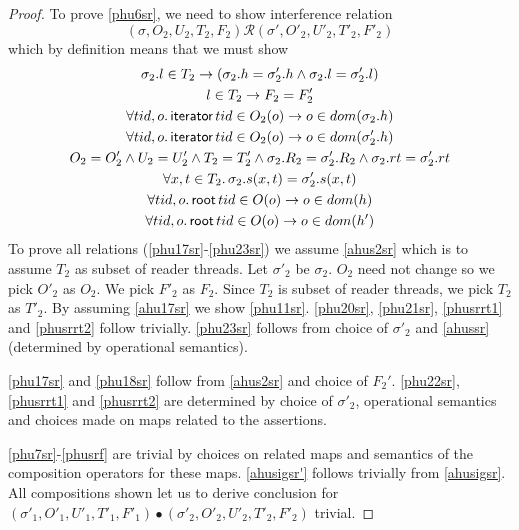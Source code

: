\begin{proof}
To prove \ref{phu6sr}, we need to show interference relation
\[(\sigma, O_2, U_2, T_2,F_2) \mathcal{R} (\sigma', O'_2, U'_2, T'_2,F'_2)  \]
which by definition means that we must show 
\begin{gather}\label{phu17sr}
  \sigma_2.l  \in  T_2 \rightarrow (\sigma_2.h =\sigma'_2.h \land \sigma_2.l=\sigma'_2.l)\\
  \label{phu18sr}
  l\in T_2\rightarrow F_2=F_2'\\
  \label{phu20sr}
  \forall tid,o\ldotp\textsf{iterator} \, tid \in O_2(o) \rightarrow o \in dom(\sigma_2.h) \\
  \label{phu21sr}
  \forall tid,o\ldotp\textsf{iterator} \, tid \in O_2(o) \rightarrow o \in dom(\sigma'_2.h) \\
  \label{phu22sr}
  O_2 = O_2' \land U_2 = U_2' \land T_2 = T_2'\land \sigma_2.R_2 = \sigma_2'.R_2 \land \sigma_2.rt = \sigma'_2.rt \\
  \label{phu23sr}
  \forall x, t \in T_2 \ldotp \sigma_2.s(x,t) = \sigma'_2.s(x,t)  \\
    \label{phusrrt1}
  \forall tid,o\ldotp\textsf{root} \, tid \in O(o) \rightarrow o \in dom(h) \\
  \label{phusrrt2}
  \forall tid,o\ldotp\textsf{root} \, tid \in O(o) \rightarrow o \in dom(h') 
\end{gather}
To prove all relations (\ref{phu17sr}-\ref{phu23sr}) we assume \ref{ahus2sr} which is to assume $T_2$ as subset of reader threads. Let $\sigma'_2$ be $\sigma_2$. $O_2$ need not change so we pick $O'_2$  as $O_2$. We pick $F'_2$ as $F_2$. Since $T_2$ is subset of reader threads, we pick $T_2$ as  $T'_2$. By assuming \ref{ahu17sr}  we show \ref{phu11sr}. \ref{phu20sr}, \ref{phu21sr}, \ref{phusrrt1} and \ref{phusrrt2} follow trivially. \ref{phu23sr} follows from choice of $\sigma'_2$ and \ref{ahussr}(determined by operational semantics).

 \ref{phu17sr} and \ref{phu18sr} follow from \ref{ahus2sr} and choice of $F_2'$. \ref{phu22sr}, \ref{phusrrt1} and \ref{phusrrt2} are determined by choice of $\sigma'_2$, operational semantics and choices made on maps related to the assertions.

\ref{phu7sr}-\ref{phusrf} are  trivial by choices on related maps and semantics of the composition operators for these maps. \ref{ahusigsr'} follows trivially from \ref{ahusigsr}. All compositions shown  let us to derive conclusion for $(\sigma'_1, O'_1, U'_1, T'_1,F'_1) \bullet (\sigma'_2, O'_2, U'_2, T'_2,F'_2) $ trivial.
 \end{proof}
